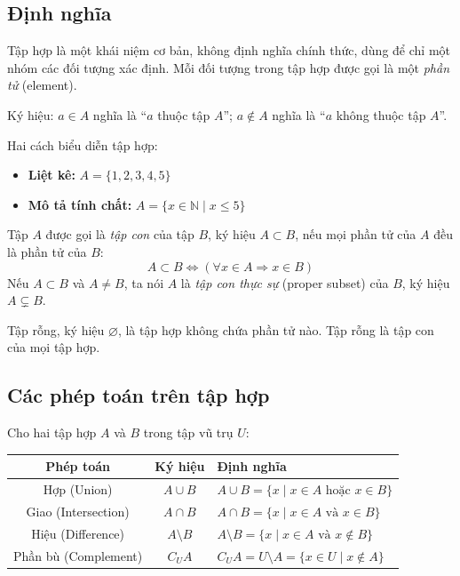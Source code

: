 \documentclass[12pt, a4paper]{report}
\begin{document}
\subsection{Định nghĩa}

\begin{dinhnghia}
  Tập hợp là một khái niệm cơ bản, không định nghĩa chính thức, dùng để chỉ một nhóm các đối tượng xác định. Mỗi đối tượng trong tập hợp được gọi là một \emph{phần tử} (element).

  \medskip
  Ký hiệu: \(a \in A\) nghĩa là ``\(a\) thuộc tập \(A\)''; \(a \notin A\) nghĩa là ``\(a\) không thuộc tập \(A\)''.

  \medskip
  Hai cách biểu diễn tập hợp:
  \begin{itemize}
    \item \textbf{Liệt kê:} \(A = \{1, 2, 3, 4, 5\}\)
    \item \textbf{Mô tả tính chất:} \(A = \{x \in \mathbb{N} \mid x \leq 5\}\)
  \end{itemize}
\end{dinhnghia}

\begin{dinhnghia}
  Tập \(A\) được gọi là \emph{tập con} của tập \(B\), ký hiệu \(A \subset B\), nếu mọi phần tử của \(A\) đều là phần tử của \(B\):
  \[
    A \subset B \iff (\forall x \in A \Rightarrow x \in B)
  \]
  Nếu \(A \subset B\) và \(A \neq B\), ta nói \(A\) là \emph{tập con thực sự} (proper subset) của \(B\), ký hiệu \(A \subsetneq B\).
\end{dinhnghia}

\begin{dinhnghia}
  Tập rỗng, ký hiệu \(\varnothing\), là tập hợp không chứa phần tử nào. Tập rỗng là tập con của mọi tập hợp.
\end{dinhnghia}

\subsection{Các phép toán trên tập hợp}

Cho hai tập hợp \(A\) và \(B\) trong tập vũ trụ \(U\):

\begin{center}
\begin{tabular}{@{}c c l@{}}
  \toprule
  \textbf{Phép toán} & \textbf{Ký hiệu} & \textbf{Định nghĩa} \\
  \midrule
  Hợp (Union)           & \(A \cup B\)      & \(A \cup B = \{x \mid x \in A \text{ hoặc } x \in B\}\) \\
  Giao (Intersection)   & \(A \cap B\)      & \(A \cap B = \{x \mid x \in A \text{ và } x \in B\}\) \\
  Hiệu (Difference)     & \(A \setminus B\) & \(A \setminus B = \{x \mid x \in A \text{ và } x \notin B\}\) \\
  Phần bù (Complement)  & \(C_U A\)         & \(C_U A = U \setminus A = \{x \in U \mid x \notin A\}\) \\
  \bottomrule
\end{tabular}
\end{center}
\end{document}
